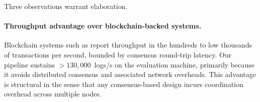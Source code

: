 \documentclass[preprint,12pt]{elsarticle}
\begin{document}
\begin{table}[t]
\centering
\caption{Deployment-critical comparison.
Ingestion and verification figures for our system are measured; figures for competing systems are derived from their respective publications or from architectural analysis (marked with~$\star$).
``Edge suitability'' reflects single-device deployability on sub-$512\,\mathrm{MB}$ RAM hardware.}
\label{tab:comparative}
\small
\renewcommand{\arraystretch}{1.35}
\setlength{\tabcolsep}{4pt}
\end{table}

Three observations warrant elaboration.

\paragraph{Throughput advantage over blockchain-backed systems.}
Blockchain systems such as \citet{putz2019secure} report throughput in the hundreds to low thousands of transactions per second, bounded by consensus round-trip latency.
Our pipeline sustains $>\!130{,}000$~logs/s on the evaluation machine, primarily because it avoids distributed consensus and associated network overheads.
This advantage is structural in the sense that any consensus-based design incurs coordination overhead across multiple nodes.
\end{document}
